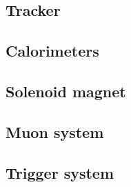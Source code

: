 \subsection{Tracker} \label{sec:InnerTracker}


\subsection{Calorimeters} \label{sec:Calorimeters}


\subsection{Solenoid magnet} \label{sec:SolenoidMagnet}


\subsection{Muon system} \label{sec:MuonSystem}


\subsection{Trigger system} \label{sec:Trigger}
 